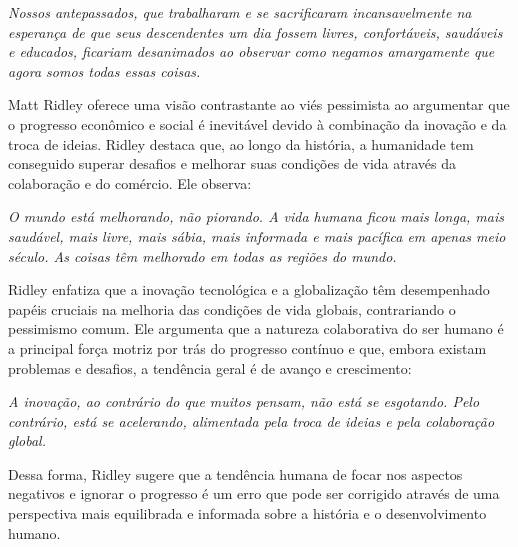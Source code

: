 \begin{citacao}
    \textit{
        Nossos antepassados, que trabalharam e se sacrificaram incansavelmente na esperança de que seus descendentes um dia fossem livres, confortáveis, saudáveis e educados, ficariam desanimados ao observar como negamos amargamente que agora somos todas essas coisas.
    } \newline
    \cite{easterbrook2004progress}
\end{citacao}

Matt Ridley oferece uma visão contrastante ao viés pessimista ao argumentar que o progresso econômico e social é inevitável devido à combinação da inovação e da troca de ideias. Ridley destaca que, ao longo da história, a humanidade tem conseguido superar desafios e melhorar suas condições de vida através da colaboração e do comércio. Ele observa:

\begin{citacao}
    \textit{
        O mundo está melhorando, não piorando. A vida humana ficou mais longa, mais saudável, mais livre, mais sábia, mais informada e mais pacífica em apenas meio século. As coisas têm melhorado em todas as regiões do mundo.
    } \newline
    \cite{ridley2010rational}
\end{citacao}

Ridley enfatiza que a inovação tecnológica e a globalização têm desempenhado papéis cruciais na melhoria das condições de vida globais, contrariando o pessimismo comum. Ele argumenta que a natureza colaborativa do ser humano é a principal força motriz por trás do progresso contínuo e que, embora existam problemas e desafios, a tendência geral é de avanço e crescimento:

\begin{citacao}
    \textit{
        A inovação, ao contrário do que muitos pensam, não está se esgotando. Pelo contrário, está se acelerando, alimentada pela troca de ideias e pela colaboração global.
    } \newline
    \cite{ridley2010rational}
\end{citacao}

Dessa forma, Ridley sugere que a tendência humana de focar nos aspectos negativos e ignorar o progresso é um erro que pode ser corrigido através de uma perspectiva mais equilibrada e informada sobre a história e o desenvolvimento humano.

